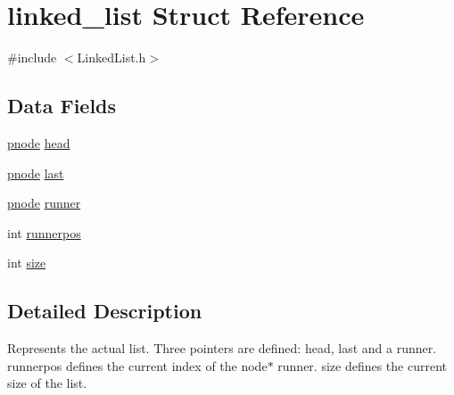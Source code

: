 \hypertarget{structlinked__list}{\section{linked\-\_\-list Struct Reference}
\label{structlinked__list}
}


{\ttfamily \#include $<$Linked\-List.\-h$>$}

\subsection*{Data Fields}
\begin{DoxyCompactItemize}
\item 
\hyperlink{_linked_list_8h_a0ba2245d580824f87132187a6b604079}{pnode} \hyperlink{structlinked__list_a164c1f55d34dec4859789a597f4f9b9a}{head}
\item 
\hyperlink{_linked_list_8h_a0ba2245d580824f87132187a6b604079}{pnode} \hyperlink{structlinked__list_a451377060c58504c44bed6e737005ef1}{last}
\item 
\hyperlink{_linked_list_8h_a0ba2245d580824f87132187a6b604079}{pnode} \hyperlink{structlinked__list_a8f4fa3d6bcc127a8b49fa8379918ee6f}{runner}
\item 
int \hyperlink{structlinked__list_a8f5e1351b3d2db36e169f8a9da02d339}{runnerpos}
\item 
int \hyperlink{structlinked__list_a439227feff9d7f55384e8780cfc2eb82}{size}
\end{DoxyCompactItemize}


\subsection{Detailed Description}
Represents the actual list. Three pointers are defined\-: head, last and a runner. runnerpos defines the current index of the node$\ast$ runner. size defines the current size of the list. 

